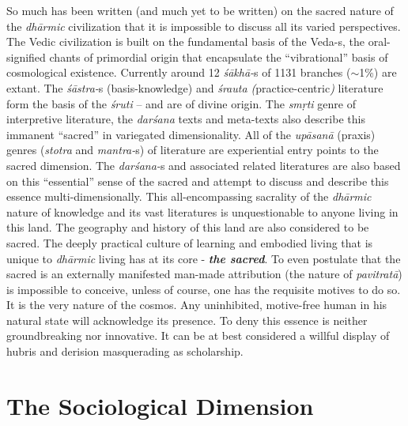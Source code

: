 So much has been written (and much yet to be written) on the sacred nature of the \textit{dhārmic} civilization that it is impossible to discuss all its varied perspectives. The Vedic civilization is built on the fundamental basis of the Veda-s, the oral-signified chants of primordial origin that encapsulate the “vibrational” basis of cosmological existence. Currently around 12 \textit{śākhā-}s of 1131 branches ($\sim$1\%) are extant. The \textit{śāstra-}s (basis-knowledge) and \textit{śrauta (}practice-centric\textit{)} literature form the basis of the \textit{śruti} – and are of divine origin. The \textit{smṛti} genre of interpretive literature, the \textit{darśana} texts and meta-texts also describe this immanent “sacred” in variegated dimensionality. All of the \textit{upāsanā} (praxis) genres (\textit{stotra} and \textit{mantra-}s) of literature are experiential entry points to the sacred dimension. The \textit{darśana-}s and associated related literatures are also based on this “essential” sense of the sacred and attempt to discuss and describe this essence multi-dimensionally. This all-encompassing sacrality of the \textit{dhārmic} nature of knowledge and its vast literatures is unquestionable to anyone living in this land. The geography and history of this land are also considered to be sacred. The deeply practical culture of learning and embodied living that is unique to \textit{dhārmic} living has at its core - \textbf{\textit{the sacred}}. To even postulate that the sacred is an externally manifested man-made attribution (the nature of \textit{pavitratā}) is impossible to conceive, unless of course, one has the requisite motives to do so. It is the very nature of the cosmos. Any uninhibited, motive-free human in his natural state will acknowledge its presence. To deny this essence is neither groundbreaking nor innovative. It can be at best considered a willful display of hubris and derision masquerading as scholarship.

\vspace{-.5cm}

\section*{The Sociological Dimension}

